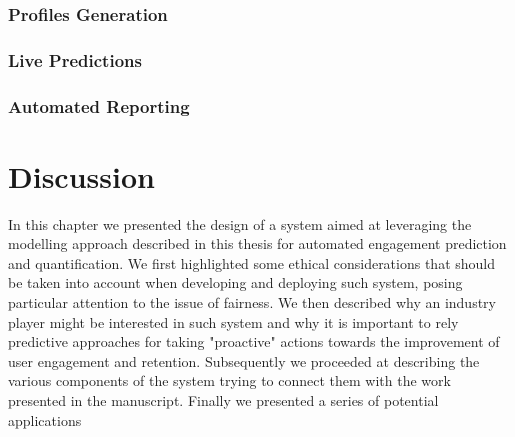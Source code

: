 \subsubsection{Profiles Generation}
\lorem

\subsubsection{Live Predictions}
\lorem

\subsubsection{Automated Reporting}
\lorem

\section{Discussion}
In this chapter we presented the design of a system aimed at leveraging the modelling approach described in this thesis for automated engagement prediction and quantification.  We first highlighted some ethical considerations that should be taken into account when developing and deploying such system, posing particular attention to the issue of fairness. We then described why an industry player might be interested in such system and why it is important to rely predictive approaches for taking "proactive" actions towards the improvement of user engagement and retention. Subsequently we proceeded at describing the various components of the system trying to connect them with the work presented in the manuscript. Finally we presented a series of potential applications 
